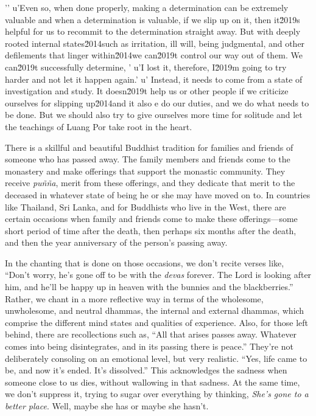 '\n'
u'Even so, when done properly, making a determination can be extremely valuable and when a determination is valuable, if we slip up on it, then it\u2019s helpful for us to recommit to the determination straight away. But with deeply rooted internal states\u2014such as irritation, ill will, being judgmental, and other defilements that linger within\u2014we can\u2019t control our way out of them. We can\u2019t successfully determine, '
u'I lost it, therefore, I\u2019m going to try harder and not let it happen again.'
u' Instead, it needs to come from a state of investigation and study. It doesn\u2019t help us or other people if we criticize ourselves for slipping up\u2014and it also e do our duties, and we do what needs to be done. But we should also 
try to give ourselves more time for solitude and let the teachings of 
Luang Por take root in the heart.


There is a skillful and beautiful Buddhist tradition for families and 
friends of someone who has passed away. The family members and friends 
come to the monastery and make offerings that support the monastic 
community. They receive \emph{puñña}, merit from these offerings, and 
they dedicate that merit to the deceased in whatever state of being he 
or she may have moved on to. In countries like Thailand, Sri Lanka, and 
for Buddhists who live in the West, there are certain occasions when 
family and friends come to make these offerings---some short period of 
time after the death, then perhaps six months after the death, and then 
the year anniversary of the person's passing away.

In the chanting that is done on those occasions, we don't recite verses 
like, ``Don't worry, he's gone off to be with the \emph{devas} forever. 
The Lord is looking after him, and he'll be happy up in heaven with the 
bunnies and the blackberries.'' Rather, we chant in a more reflective 
way in terms of the wholesome, unwholesome, and neutral dhammas, the 
internal and external dhammas, which comprise the different mind states 
and qualities of experience. Also, for those left behind, there are 
recollections such as, ``All that arises passes away. Whatever comes 
into being disintegrates, and in its passing there is peace.'' They're 
not deliberately consoling on an emotional level, but very realistic. 
``Yes, life came to be, and now it's ended. It's dissolved.'' This 
acknowledges the sadness when someone close to us dies, without 
wallowing in that sadness. At the same time, we don't suppress it, 
trying to sugar over everything by thinking, \emph{She's gone to a 
better place}. Well, maybe she has or maybe she hasn't.

